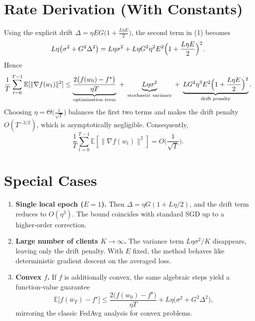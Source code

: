 \documentclass{article}
\newcommand{\E}{\mathbb{E}}
\begin{document}
\section*{Rate Derivation (With Constants)}
Using the explicit drift $\Delta=\eta E G\bigl(1+\frac{L\eta E}{2}\bigr)$,
the second term in (1) becomes
\[
L\eta\big(\sigma^2+G^2\Delta^2\big)
= L\eta\sigma^2
  + L\eta G^2\eta^2E^2\Bigl(1+\frac{L\eta E}{2}\Bigr)^2 .
\]
Hence
\[
\frac1T\sum_{t=0}^{T-1}\E[\|\nabla f(w_t)\|^2]
\le
\underbrace{\frac{2\big(f(w_0)-f^\star\big)}{\eta T}}_{\text{optimization term}}
\;+\;
\underbrace{L\eta\sigma^2}_{\text{stochastic variance}}
\;+\;
\underbrace{L G^2 \eta^3 E^2\Bigl(1+\frac{L\eta E}{2}\Bigr)^2}_{\text{drift penalty}} .
\]
Choosing $\eta = \Theta\!\big(\frac{1}{\sqrt{T}}\big)$ balances the first two
terms and makes the drift penalty $O(T^{-3/2})$, which is asymptotically
negligible. Consequently,
\[
\frac1T\sum_{t=0}^{T-1}\E[\|\nabla f(w_t)\|^2]=O\!\Big(\frac{1}{\sqrt{T}}\Big).
\]

\section*{Special Cases}
\begin{enumerate}
\item \textbf{Single local epoch ($E=1$).}  
Then $\Delta = \eta G(1+L\eta/2)$, and the drift term reduces to
$O(\eta^3)$. The bound coincides with standard SGD up to a higher‑order
correction.
\item \textbf{Large number of clients $K\to\infty$.}  
The variance term $L\eta\sigma^2/K$ disappears, leaving only the drift
penalty. With $E$ fixed, the method behaves like deterministic gradient
descent on the averaged loss.
\item \textbf{Convex $f$.}  
If $f$ is additionally convex, the same algebraic steps yield a
function‑value guarantee
\[
\E\big[f(\bar w_T)-f^\star\big]\le
\frac{2\big(f(w_0)-f^\star\big)}{\eta T}
+L\eta\big(\sigma^2+G^2\Delta^2\big),
\]
mirroring the classic FedAvg analysis for convex problems.
\end{enumerate}
\end{document}
